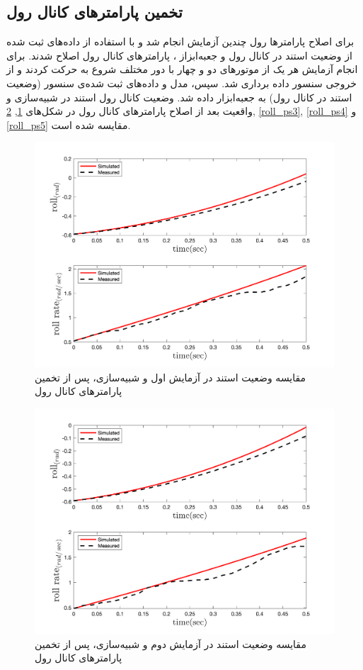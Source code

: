 \subsection{تخمین پارامترهای کانال رول}
برای اصلاح پارامترها رول چندین آزمایش انجام شد و با استفاده از داده‌های ثبت شده از وضعیت استند در کانال رول و جعبه‌ابزاز
،
پارامترهای کانال رول اصلاح شدند.
برای انجام آزمایش هر یک از موتورهای دو و چهار  با دور مختلف شروع به حرکت کردند و از خروجی سنسور داده برداری شد. سپس، مدل و داده‌های ثبت شده‌ی سنسور (وضعیت استند در کانال رول) به جعبه‌ابزار
داده شد. وضعیت کانال رول استند در شبیه‌سازی و واقعیت بعد از اصلاح پارامترهای کانال رول در شکل‌های
\ref{roll_ps1}, \ref{roll_ps2}, \ref{roll_ps3}, \ref{roll_ps4} و \ref{roll_ps5}
مقایسه شده است.

\begin{figure}[H]
	\includegraphics[width=12cm]{../../Figures/RCP/roll_parameter_estimation/RCP_roll_S1.png}
	\centering
	\caption{مقايسه وضعیت استند در  آزمايش اول و شبیه‌سازی، پس از تخمین پارامترهای کانال رول}
	\label{roll_ps1}
\end{figure}
\begin{figure}[H]
	\includegraphics[width=12cm]{../../Figures/RCP/roll_parameter_estimation/RCP_roll_S2.png}
	\centering
	\caption{مقايسه وضعیت استند در  آزمايش دوم و شبیه‌سازی، پس از تخمین پارامترهای کانال رول}
	\label{roll_ps2}
\end{figure}
